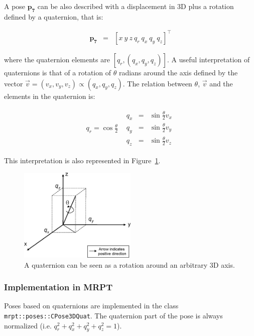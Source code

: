 \documentclass[a4paper,10pt]{report}
\begin{document}
A pose $\mathbf{p_7}$ can be also described with a displacement in 3D plus a rotation 
defined by a quaternion, that is:

\begin{eqnarray}
\mathbf{p_7} &=& [x ~ y ~ z ~  q_r ~ q_x ~ q_y ~ q_z ] ^ \top
\end{eqnarray}

\noindent where the quaternion elements are $[q_r, (q_x,q_y,q_z)]$. A useful interpretation of quaternions
is that of a rotation of $\theta$ radians around the axis defined by the vector $\vec{v} = (v_x,v_y,v_z) \propto (q_x,q_y,q_z)$.
The relation between $\theta$, $\vec{v}$ and the elements in the quaternion is:

\begin{equation*}
\begin{array}{cc}
q_r = \cos\frac{\theta}{2}  &  
  \begin{array}{rcl}
    q_x &=& \sin\frac{\theta}{2} v_x  \\
    q_y &=& \sin\frac{\theta}{2} v_y  \\
    q_z &=& \sin\frac{\theta}{2} v_z  
  \end{array}
\end{array}
\end{equation*}

This interpretation is also represented in Figure~\ref{fig:quat}.

\begin{figure}[h]
\centering
\includegraphics[width=0.50\textwidth]{quaternion.eps}
\caption{A quaternion can be seen as a rotation around an arbitrary 3D axis.}
\label{fig:quat}
\end{figure}


\subsubsection{Implementation in MRPT}

Poses based on quaternions are implemented in the class \texttt{mrpt::poses::CPose3DQuat}. 
The quaternion part of the pose is always normalized (i.e. $q_r^2+q_x^2+q_y^2+q_z^2=1$).
\end{document}
